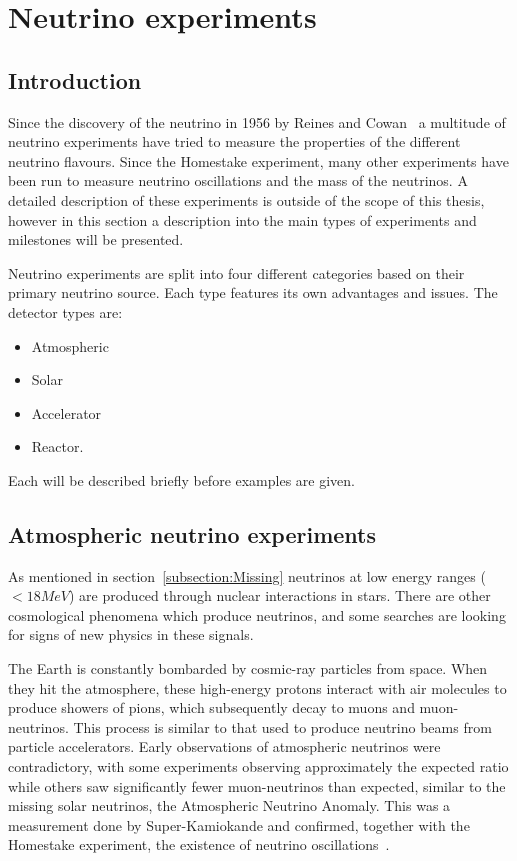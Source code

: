 \chapter{Neutrino  experiments}
\label{c:expIntro}

\section{Introduction}
Since the discovery of the neutrino in 1956 by Reines and Cowan~\cite{6Reines} a multitude of neutrino experiments have tried to measure the properties of the different neutrino flavours. Since the Homestake experiment, many other experiments have been run to measure neutrino oscillations and the mass of the neutrinos. A detailed description of these experiments is outside of the scope of this thesis, however in this section a description into the main types of experiments and milestones will be presented.

Neutrino experiments are split into four different categories based on their primary neutrino source. Each type features its own advantages and issues.
The detector types are:
\begin{itemize}
\item Atmospheric
\item Solar
\item Accelerator
\item Reactor.
\end{itemize}
Each will be described briefly before examples are given.

\pagebreak
\newpage
\section{Atmospheric neutrino experiments}

As mentioned in section~\ref{subsection:Missing} neutrinos at low energy ranges ($<18 MeV$) are produced through nuclear interactions in stars. There are other cosmological phenomena which produce neutrinos, and some searches are looking for signs of new physics in these signals. 

The Earth is constantly bombarded by cosmic-ray particles from space. When they hit the atmosphere, these high-energy protons interact with air molecules to produce showers of pions, which subsequently decay to muons and muon-neutrinos. This process is similar to that used to produce neutrino beams from particle accelerators. Early observations of atmospheric neutrinos were contradictory, with some experiments observing approximately the expected ratio while others saw significantly fewer muon-neutrinos than expected, similar to the missing solar neutrinos, the Atmospheric Neutrino Anomaly. This was a measurement done by Super-Kamiokande and confirmed, together with the Homestake experiment, the existence of neutrino oscillations~\cite{10Fukuda, 9Davis}.

